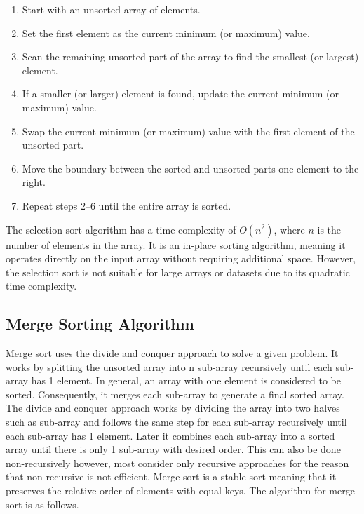 \documentclass{article}
\begin{document}
\begin{enumerate}
    \item Start with an unsorted array of elements.
    \item Set the first element as the current minimum (or maximum) value.
    \item Scan the remaining unsorted part of the array to find the smallest (or largest) element.
    \item If a smaller (or larger) element is found, update the current minimum (or maximum) value.
    \item Swap the current minimum (or maximum) value with the first element of the unsorted part.
    \item Move the boundary between the sorted and unsorted parts one element to the right.
    \item Repeat steps 2--6 until the entire array is sorted.
\end{enumerate}

The selection sort algorithm has a time complexity of $O(n^2)$, where $n$ is the number of elements in the array. It is an in-place sorting algorithm, meaning it operates directly on the input array without requiring additional space. However, the selection sort is not suitable for large arrays or datasets due to its quadratic time complexity.

\subsection{Merge Sorting Algorithm}

Merge sort uses the divide and conquer approach to solve a given problem. It
works by splitting the unsorted array into n sub-array recursively until each sub-array has 1 element. In general, an array with one element is considered to be
sorted. Consequently, it merges each sub-array to generate a final sorted array. The
divide and conquer approach works by dividing the array into two halves such as
sub-array and follows the same step for each sub-array recursively until each sub-array has 1 element. Later it combines each sub-array into a sorted array until there
is only 1 sub-array with desired order. This can also be done non-recursively
however, most consider only recursive approaches for the reason that non-recursive
is not efficient. Merge sort is a stable sort meaning that it preserves the relative
order of elements with equal keys. The algorithm for merge sort is as follows.\cite{elkahlout2017comparative}
\end{document}
